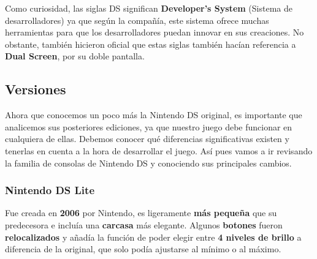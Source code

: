 \vspace{0.5cm}

Como curiosidad, las siglas DS significan \textbf{Developer's System} (Sistema de desarrolladores) ya que según la compañía, este sistema ofrece muchas herramientas para que los desarrolladores puedan innovar en sus creaciones. No obstante, también hicieron oficial que estas siglas también hacían referencia a \textbf{Dual Screen}, por su doble pantalla.

\vspace{1cm}

\subsection{Versiones}

Ahora que conocemos un poco más la Nintendo DS original, es importante que analicemos sus posteriores ediciones, ya que nuestro juego debe funcionar en cualquiera de ellas. Debemos conocer qué diferencias significativas existen y tenerlas en cuenta a la hora de desarrollar el juego. Así pues vamos a ir revisando la familia de consolas de Nintendo DS y conociendo sus principales cambios.

\vspace{1cm}



\subsubsection{Nintendo DS Lite}

Fue creada en \textbf{2006} por Nintendo, es ligeramente \textbf{más pequeña} que su predecesora e incluía una \textbf{carcasa} más elegante. Algunos \textbf{botones} fueron \textbf{relocalizados} y añadía la función de poder elegir entre \textbf{4 niveles de brillo} a diferencia de la original, que solo podía ajustarse al mínimo o al máximo.

\vspace{0.5cm}

